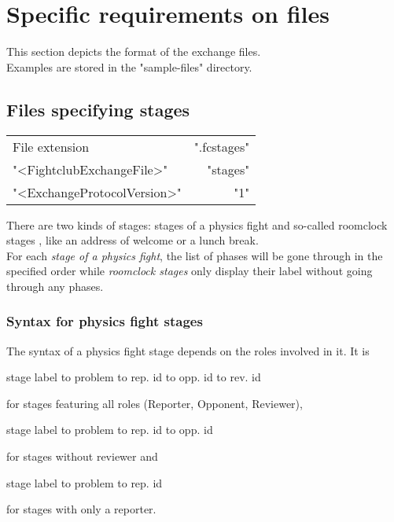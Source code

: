 \documentclass[11pt]{ltxdoc}
\def\highlight#1{%
    \colorbox{red!15}{#1}%
    \index{\textsf{#1}}}
\newlength{\ccharwidth}
\def\tab{\hbox to \ccharwidth {{\rmfamily\small\mapsto}}}
\begin{document}
    
    
    
    
    \section{Specific requirements on files}
    This section depicts the format of the exchange files. \\
    Examples are stored in the "sample-files" directory.
    
    
    \subsection{Files specifying stages}\label{sec:files-stages}
    \begin{center}
        \begin{tabular}{lr}
            File extension & ".fcstages" \\
            "<FightclubExchangeFile>" & "stages" \\
            "<ExchangeProtocolVersion>" & "1"
        \end{tabular}
    \end{center}
    
    
    There are two kinds of stages: stages of a physics fight and so-called \highlight{roomclock stages}, like an address of welcome or a lunch break. \\
    For each \textit{stage of a physics fight}, the list of phases will be gone through in the specified order while \textit{roomclock stages} only display their label without going through any phases.

    
    \subsubsection*{Syntax for physics fight stages}
    The syntax of a physics fight stage depends on the roles involved in it. It is
    \begin{center}\ttfamily
        stage label  \tab problem  \tab rep. id  \tab opp. id  \tab rev. id
    \end{center}
    for stages featuring all roles (Reporter, Opponent, Reviewer),
    \begin{center}\ttfamily
        stage label  \tab problem  \tab rep. id  \tab opp. id
    \end{center}
    for stages without reviewer and
    \begin{center}\ttfamily
        stage label  \tab problem  \tab rep. id
    \end{center}
    for stages with only a reporter.
    
\end{document}
